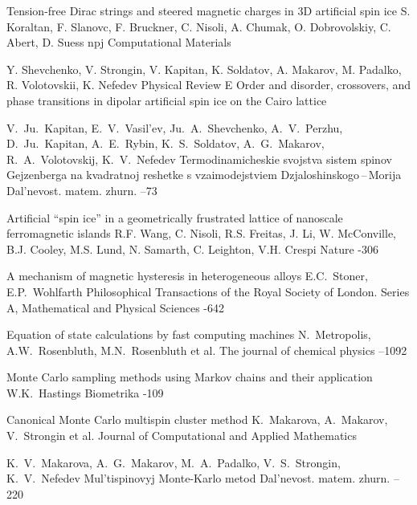 \documentclass[10pt]{article}
\begin{document}
{\begin{thebibliography}{4}
\paper Tension-free Dirac strings and steered magnetic charges in 3D artificial spin ice
\by S. Koraltan, F. Slanovc, F. Bruckner, C. Nisoli, A. Chumak, O. Dobrovolskiy, C. Abert, D. Suess
\jour npj Computational Materials

\by Y. Shevchenko, V. Strongin, V. Kapitan, K. Soldatov, A. Makarov, M. Padalko, R. Volotovskii, K. Nefedev
\jour Physical Review E
\paper Order and disorder, crossovers, and phase transitions in dipolar artificial spin ice on the Cairo lattice

\by V.~Ju.~Kapitan, E.~V.~Vasil'ev, Ju.~A.~Shevchenko, A.~V.~Perzhu, D.~Ju.~Kapitan, A.~E.~Rybin, K.~S.~Soldatov, A.~G.~Makarov, R.~A.~Volotovskij, K.~V.~Nefedev
\paper Termodinamicheskie svojstva sistem spinov Gejzenberga na kvadratnoj reshetke s vzaimodejstviem Dzjaloshinskogo\,--\,Morija
\jour Dal'nevost. matem. zhurn.
--73

\paper Artificial ``spin ice'' in a geometrically frustrated lattice of nanoscale ferromagnetic islands
\by R.F. Wang, C. Nisoli, R.S. Freitas, J. Li, W. McConville, B.J. Cooley, M.S. Lund, N. Samarth, C. Leighton, V.H. Crespi
\jour Nature
-306

\paper A mechanism of magnetic hysteresis in heterogeneous alloys
\by E.C.~Stoner, E.P.~Wohlfarth
\jour Philosophical Transactions of the Royal Society of London. Series A, Mathematical and Physical Sciences
-642

\paper Equation of state calculations by fast computing machines
\by N.~Metropolis, A.W.~Rosenbluth, M.N.~Rosenbluth et al.
\jour The journal of chemical physics
--1092

\paper Monte Carlo sampling methods using Markov chains and their application
\by W.K.~Hastings
\jour Biometrika
-109

\paper Canonical Monte Carlo multispin cluster method
\by K.~Makarova, A.~Makarov, V.~Strongin et al.
\jour Journal of Computational and Applied Mathematics

\by K.~V.~Makarova, A.~G.~Makarov, M.~A.~Padalko, V.~S.~Strongin, K.~V.~Nefedev
\paper Mul'tispinovyj Monte-Karlo metod
\jour Dal'nevost. matem. zhurn.
--220


\end{thebibliography}}
\end{document}
